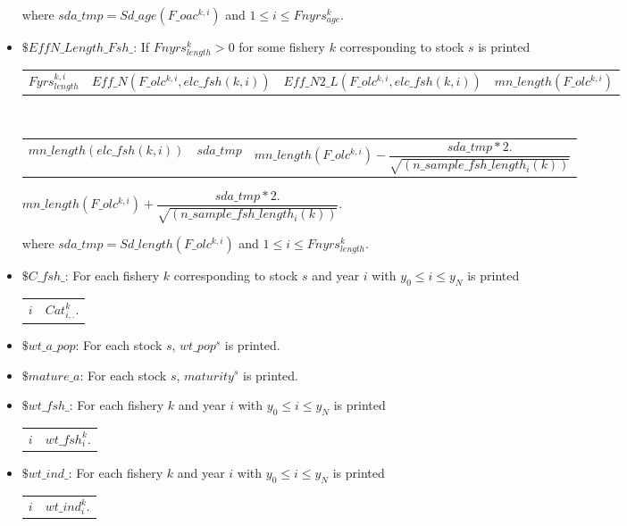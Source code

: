 \documentclass{article}
\begin{document}
\begin{itemize}
\begin{center}
\end{center}
where $sda\_tmp=Sd\_age(F\_oac^{k,i})$ and $1\leq i \leq Fnyrs^k_{age}$.


\item $\$ EffN\_Length\_Fsh\_$: If $Fnyrs^k_{length}>0$ for some fishery $k$ corresponding to stock $s$ is printed
\begin{tabular}{c c c c }
    $Fyrs^{k,i}_{length}$ & $Eff\_N(F\_olc^{k,i},elc\_fsh(k,i))$  & $Eff\_N2\_L(F\_olc^{k,i},elc\_fsh(k,i))$ & $mn\_length(F\_olc^{k,i})$  \\
\end{tabular}
 \\
\begin{tabular}{c c c }
     $mn\_length(elc\_fsh(k,i))$ & $sda\_tmp$ & $mn\_length(F\_olc^{k,i}) - \dfrac{sda\_tmp *2.}{ \sqrt{(n\_sample\_fsh\_length_i(k))}}$ 
\end{tabular}
\begin{center}
    $mn\_length(F\_olc^{k,i}) + \dfrac{sda\_tmp *2.}{ \sqrt{(n\_sample\_fsh\_length_i(k))}}$.  \\
     
\end{center}
where $sda\_tmp=Sd\_length(F\_olc^{k,i})$ and $1\leq i \leq Fnyrs^k_{length}$.

\item $\$ C\_fsh\_$: For each fishery $k$ corresponding to stock $s$ and year $i$ with $y_0 \leq i \leq y_N$ is printed
\begin{center}
    \begin{tabular}{c c}
       $i$  &  $Cat^k_{i,.}$. \\
    \end{tabular}
\end{center}

\item $\$ wt\_a\_pop$: For each stock $s$, $wt\_pop^s$ is printed. 

\item $\$ mature\_a$: For each stock $s$, $maturity^s$ is printed.

\item $\$ wt\_fsh\_$: For each fishery $k$ and year $i$ with $y_0 \leq i \leq y_N$ is printed

\begin{center}
    \begin{tabular}{c c}
        $i$  & $wt\_fsh^k_i$. \\
    \end{tabular}
\end{center}
\item $\$ wt\_ind\_$: For each fishery $k$ and year $i$ with $y_0 \leq i \leq y_N$ is printed
\begin{center}
    \begin{tabular}{c c}
       $i$  &  $wt\_ind^k_i$.\\
    \end{tabular}
\end{center}


\end{itemize}
\end{document}
